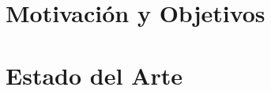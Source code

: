 










\section{Motivaci\'on y Objetivos}
\label{sec:intro.objetivos}



\section{Estado del Arte}
\label{sec:intro.estado-del-arte}

